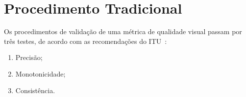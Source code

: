 \chapter{Procedimento Tradicional}

Os procedimentos de validação de uma métrica de qualidade visual passam por três testes, de acordo com as recomendações do ITU~\cite{itut2004}:

\begin{enumerate}
	\item Precisão;
	\item Monotonicidade;
	\item Consistência.
\end{enumerate}


